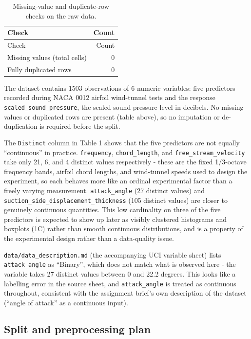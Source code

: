 \documentclass[
  11pt,
]{article}
\begin{document}
\begin{longtable}[]{@{}lr@{}}
\caption{Missing-value and duplicate-row checks on the raw
data.}\tabularnewline
\toprule\noalign{}
Check & Count \\
\midrule\noalign{}
\endfirsthead
\toprule\noalign{}
Check & Count \\
\midrule\noalign{}
\endhead
\bottomrule\noalign{}
\endlastfoot
Missing values (total cells) & 0 \\
Fully duplicated rows & 0 \\
\end{longtable}

The dataset contains 1503 observations of 6 numeric variables: five
predictors recorded during NACA 0012 airfoil wind-tunnel tests and the
response \texttt{scaled\_sound\_pressure}, the scaled sound pressure
level in decibels. No missing values or duplicated rows are present
(table above), so no imputation or de-duplication is required before the
split.

The \texttt{Distinct} column in Table 1 shows that the five predictors
are not equally ``continuous'' in practice. \texttt{frequency},
\texttt{chord\_length}, and \texttt{free\_stream\_velocity} take only
21, 6, and 4 distinct values respectively - these are the fixed
1/3-octave frequency bands, airfoil chord lengths, and wind-tunnel
speeds used to design the experiment, so each behaves more like an
ordinal experimental factor than a freely varying measurement.
\texttt{attack\_angle} (27 distinct values) and
\texttt{suction\_side\_displacement\_thickness} (105 distinct values)
are closer to genuinely continuous quantities. This low cardinality on
three of the five predictors is expected to show up later as visibly
clustered histograms and boxplots (1C) rather than smooth continuous
distributions, and is a property of the experimental design rather than
a data-quality issue.

\texttt{data/data\_description.md} (the accompanying UCI variable sheet)
lists \texttt{attack\_angle} as ``Binary'', which does not match what is
observed here - the variable takes 27 distinct values between 0 and 22.2
degrees. This looks like a labelling error in the source sheet, and
\texttt{attack\_angle} is treated as continuous throughout, consistent
with the assignment brief's own description of the dataset (``angle of
attack'' as a continuous input).

\subsection{Split and preprocessing
plan}\label{split-and-preprocessing-plan}
\end{document}
